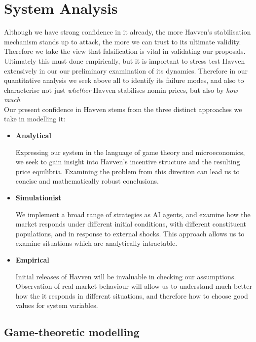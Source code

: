 \section{System Analysis}

Although we have strong confidence in it already, the more Havven's stabilisation mechanism
stands up to attack, the more we can trust to its ultimate validity.
Therefore we take the view that falsification is vital in validating our
proposals. \\

\noindent Ultimately this must done empirically, but it is important to stress test
Havven extensively in our our preliminary examination of its dynamics.
Therefore in our quantitative analysis we seek above all to identify its failure
modes, and also to characterise not just \textit{whether} Havven stabilises
nomin prices, but also by \textit{how much}.\\

\noindent Our present confidence in Havven stems from the three distinct approaches 
we take in modelling it:
\begin{itemize}
    \item[] \textbf{Analytical}
    
	Expressing our system in the language of game theory and microeconomics,
	we seek to gain insight into Havven's incentive structure and the resulting
	price equilibria. Examining the problem from this direction can lead us to
	concise and mathematically robust conclusions.

    \item[] \textbf{Simulationist}

    We implement a broad range of strategies as AI agents, and examine how the
    market responds under different initial conditions, with different constituent
	populations, and in response to external shocks. This approach allows us to
	examine situations which are analytically intractable.

    \item[] \textbf{Empirical}

    Initial releases of Havven will be invaluable in checking our assumptions.
    Observation of real market behaviour will allow us to understand much better
    how the it responds in different situations, and therefore how to choose good values
    for system variables.
\end{itemize}


\subsection{Game-theoretic modelling}

